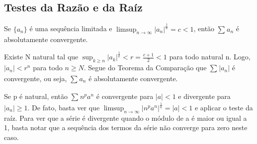 \documentclass[Analysis/analysis_notes.tex]{subfiles}
\begin{document}
\subsection{Testes da Raz\~ao e da Ra\'iz}
 \begin{theorem*}
   Se $\{a_{n}\}$ \'e uma sequ\^encia limitada e $\limsup_{n\to\infty}|a_{n}|^{\frac{1}{n}} = c < 1$, ent\~ao $\sum\limits_{}^{}a_{n}$
  \'e absolutamente convergente.
 \end{theorem*}
\begin{proof*}
  Existe N natural tal que $\sup_{k\geq{n}}|a_{k}|^{\frac{1}{k}} < r = \frac{c+1}{2} < 1$ para todo natural n. Logo, $|a_{n}|<r^{n}$ para
todo $n\geq{N}.$ Segue do Teorema da Compara\c c\~ao que $\sum\limits_{}^{}|a_{n}|$ \'e convergente, ou seja, $\sum\limits_{}^{}a_{n}$ \'e absolutamente convergente. \qedsymbol
\end{proof*}
\begin{example}
  Se p \'e natural, ent\~ao $\sum\limits_{}^{}n^{p}a^{n}$ \'e convergente para $|a|< 1$ e divergente para $|a_{n}| \geq{1}.$ De fato,
basta ver que $\limsup_{n\to\infty}|n^{p}a^{n}|^{\frac{1}{n}} = |a| < 1$ e aplicar o teste da ra\'iz. Para ver que a s\'erie \'e divergente 
quando o m\'odulo de a \'e maior ou igual a 1, basta notar que a sequ\^encia dos termos da s\'erie n\~ao converge para zero neste caso. \qedsymbol
\end{example}
\end{document}
